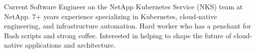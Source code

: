 

\begin{cvparagraph}

Current Software Engineer on the NetApp Kubernetes Service (NKS) team at NetApp. 7+ years experience specializing in Kubernetes, cloud-native engineering, and infrastructure automation. Hard worker who has a penchant for Bash scripts and strong coffee. Interested in helping to shape the future of cloud-native applications and architecture.
\end{cvparagraph}

